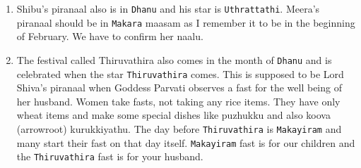 \documentclass[10pt,twoside]{article}
\begin{document}
\begin{enumerate}
\item Shibu's piranaal also is in \verb|Dhanu| and his star is \verb|Uthrattathi|. Meera's piranaal should be in \verb|Makara| maasam as I remember it to be in the beginning of February. We have to confirm her naalu.
\item The festival called Thiruvathira also comes in the month of \verb|Dhanu| and is celebrated when the star \verb|Thiruvathira| comes. This is supposed to be Lord Shiva's piranaal when Goddess Parvati observes a fast for the well being of her husband. Women take fasts, not taking any rice items. They have only wheat items and make some special dishes like puzhukku and also koova (arrowroot) kurukkiyathu. The day before \verb|Thiruvathira| is \verb|Makayiram| and many start their fast on that day itself. \verb|Makayiram| fast is for our children and the \verb|Thiruvathira| fast is for your husband.
\end{enumerate}
\end{document}
